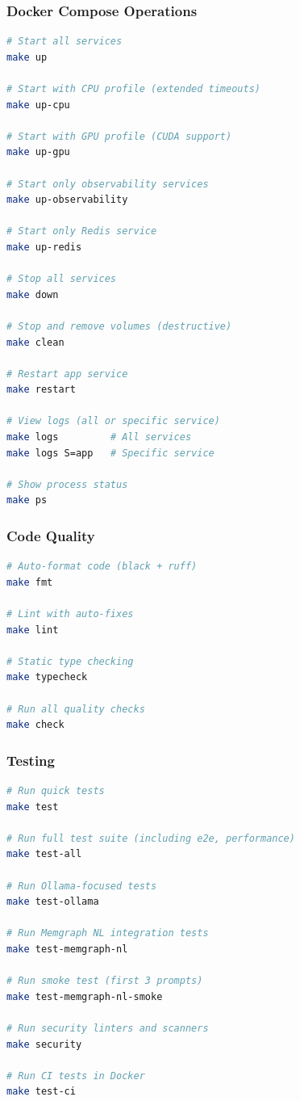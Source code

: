 \subsubsection{Docker Compose Operations}

\begin{lstlisting}[language=bash, caption=Docker Compose targets]
# Start all services
make up

# Start with CPU profile (extended timeouts)
make up-cpu

# Start with GPU profile (CUDA support)
make up-gpu

# Start only observability services
make up-observability

# Start only Redis service
make up-redis

# Stop all services
make down

# Stop and remove volumes (destructive)
make clean

# Restart app service
make restart

# View logs (all or specific service)
make logs         # All services
make logs S=app   # Specific service

# Show process status
make ps
\end{lstlisting}

\subsubsection{Code Quality}

\begin{lstlisting}[language=bash, caption=Code quality targets]
# Auto-format code (black + ruff)
make fmt

# Lint with auto-fixes
make lint

# Static type checking
make typecheck

# Run all quality checks
make check
\end{lstlisting}

\subsubsection{Testing}

\begin{lstlisting}[language=bash, caption=Testing targets]
# Run quick tests
make test

# Run full test suite (including e2e, performance)
make test-all

# Run Ollama-focused tests
make test-ollama

# Run Memgraph NL integration tests
make test-memgraph-nl

# Run smoke test (first 3 prompts)
make test-memgraph-nl-smoke

# Run security linters and scanners
make security

# Run CI tests in Docker
make test-ci
\end{lstlisting}


